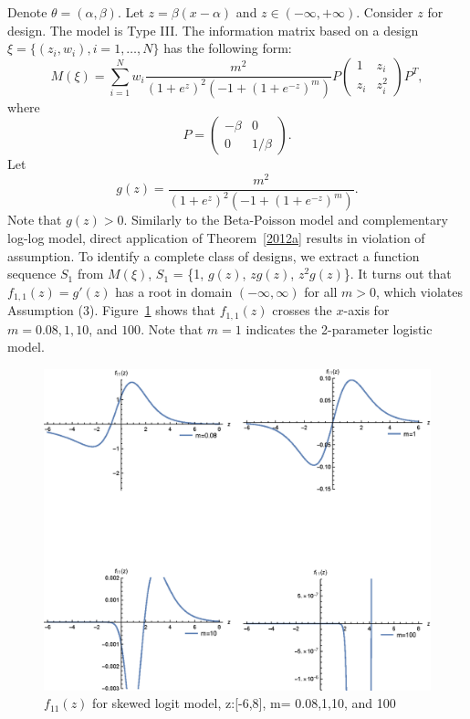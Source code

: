 \documentclass[12pt]{TD-CJS}
\begin{document}
Denote $\theta = (\alpha,\beta)$. Let $z = \beta(x-\alpha)$ and $z\in (-\infty,+\infty)$. Consider $z$ for design. The model is Type III. The information matrix based on a design $\xi = \{(z_i,w_i), i=1, \ldots, N\}$ has the following form: \[
M(\xi) = \sum_{i=1}^{N} w_i \frac{m^2}{(1+e^z)^2(-1+(1+e^{-z})^m)}P \left( \begin{array}{cc}
1 & z_i\\
z_i & z_i^2
\end{array} \right) P^T,
\] where \[P = \left( \begin{array}{cc}
-\beta & 0\\
0 & 1/\beta
\end{array} \right).\] 
Let \[g(z) =  \frac{m^2}{(1+e^z)^2(-1+(1+e^{-z})^m)}.\] Note that $g(z)>0$.  Similarly to the Beta-Poisson model and complementary log-log model, direct application of Theorem~\ref{2012a} results in violation of assumption. To identify a complete class of designs, we extract a function sequence $S_1$ from $M(\xi)$,  $S_1$ = \{1, $g(z)$, $zg(z)$, $z^2g(z)$\}. It turns out that $f_{1,1}(z) = g'(z)$ has a root in domain $(-\infty,\infty)$ for all $m>0$, which violates Assumption (3).  Figure~\ref{fig:skewedlogit_before} shows that $f_{1,1}(z) $ crosses the $x$-axis for $m = 0.08, 1, 10$, and $100$. Note that $m=1$ indicates the 2-parameter logistic model.  
\begin{figure}[ht]
    \centering
    \includegraphics[scale = 0.8]{fig1.eps}
    \caption{$f_{11}(z)$ for skewed logit model, z:[-6,8], m= 0.08,1,10, and 100}
    \label{fig:skewedlogit_before}
\end{figure}
\end{document}
